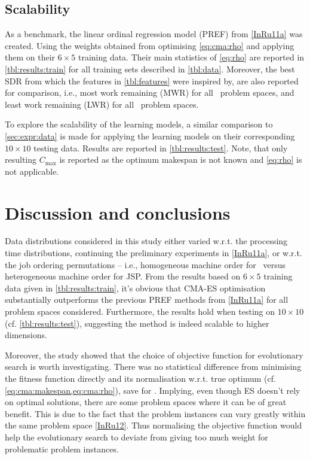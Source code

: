 \subsection{Scalability}\label{sec:expr:scalability} 
As a benchmark, the linear ordinal regression model (PREF) from \cref{InRu11a} 
was created.
Using the weights obtained from optimising \cref{eq:cma:rho} and applying them 
on their  $6\times5$ training data. Their main statistics of \cref{eq:rho} 
are reported in \cref{tbl:results:train} for all training sets described in 
\cref{tbl:data}. Moreover, the best SDR from which the features in 
\cref{tbl:features} were inspired by, are also reported for comparison, i.e., 
most work remaining (MWR) for all \JSP\ problem spaces, and least work 
remaining (LWR) for all \FSP\ problem spaces.

To explore the scalability of the learning models, a similar comparison to 
\cref{sec:expr:data} is made for applying the learning models on their 
corresponding $10\times10$ testing data. Results are reported in 
\cref{tbl:results:test}. Note, that only resulting $C_{\max}$ is reported as 
the optimum makespan is not known and \cref{eq:rho} is not applicable. 

{\setlength{\tabcolsep}{3pt}
    
    
}

\section{Discussion and conclusions}\label{sec:disc}
Data distributions considered in this study either varied 
w.r.t. the processing time distributions, continuing the preliminary 
experiments in  \cref{InRu11a}, or 
w.r.t. the job ordering permutations -- i.e., homogeneous machine order for 
\FSP\ versus heterogeneous machine order for JSP. 
From the results based on $6\times5$ training data given  in 
\cref{tbl:results:train}, it's obvious that CMA-ES optimisation substantially 
outperforms the previous PREF methods from \cref{InRu11a} for all problem 
spaces considered. Furthermore, the results hold when testing on $10\times10$ 
(cf. \cref{tbl:results:test}), suggesting the method is indeed scalable to 
higher dimensions. 

Moreover, the study showed that the choice of objective function  for 
evolutionary search is worth investigating. There was no statistical difference 
from minimising the fitness function directly and its normalisation w.r.t. true 
optimum (cf. \cref{eq:cma:makespan,eq:cma:rho}), save for . 
Implying, even though ES doesn't rely on optimal solutions, there are some 
problem spaces where it can be of great benefit. This is due to the fact that 
the problem instances can vary greatly within the same problem space 
\cref{InRu12}. Thus normalising the objective function would help the 
evolutionary search to deviate from giving too much weight for problematic 
problem instances.


